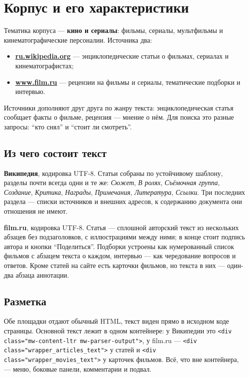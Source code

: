 \section{Корпус и его характеристики}

Тематика корпуса --- \textbf{кино и сериалы}: фильмы, сериалы, мультфильмы и
кинематографические персоналии. Источника два:

\begin{itemize}
    \item \href{https://ru.wikipedia.org/}{\textbf{ru.wikipedia.org}} --- энциклопедические
          статьи о фильмах, сериалах и кинематографистах;
    \item \href{https://www.film.ru/}{\textbf{www.film.ru}} --- рецензии на фильмы и
          сериалы, тематические подборки и интервью.
\end{itemize}

Источники дополняют друг друга по жанру текста: энциклопедическая статья сообщает факты
о фильме, рецензия --- мнение о нём. Для поиска это разные запросы: \enquote{кто снял} и
\enquote{стоит ли смотреть}.

\subsection*{Из чего состоит текст}

\textbf{Википедия}, кодировка UTF-8. Статьи собраны по устойчивому шаблону, разделы почти
всегда одни и те же: \emph{Сюжет}, \emph{В ролях}, \emph{Съёмочная группа},
\emph{Создание}, \emph{Критика}, \emph{Награды}, \emph{Примечания}, \emph{Литература},
\emph{Ссылки}. Три последних раздела --- списки источников и внешних адресов, к
содержанию документа они отношения не имеют.

\textbf{film.ru}, кодировка UTF-8. Статья --- сплошной авторский текст из нескольких
абзацев без подзаголовков, с иллюстрациями между ними; в конце стоит подпись автора и
кнопки \enquote{Поделиться}. Подборки устроены как нумерованный список фильмов с
абзацем текста о каждом, интервью --- как чередование вопросов и ответов. Кроме статей
на сайте есть карточки фильмов, но текста в них --- один-два абзаца аннотации.

\subsection*{Разметка}

Обе площадки отдают обычный HTML, текст виден прямо в исходном коде страницы. Основной
текст лежит в одном контейнере: у Википедии это
\texttt{<div class="mw-content-ltr mw-parser-output">}, у film.ru ---
\texttt{<div class="wrapper\_articles\_text">} у статей и
\texttt{<div class="wrapper\_movies\_text">} у карточек фильмов. Всё, что вне
контейнера, --- меню, боковые панели, комментарии и подвал.

